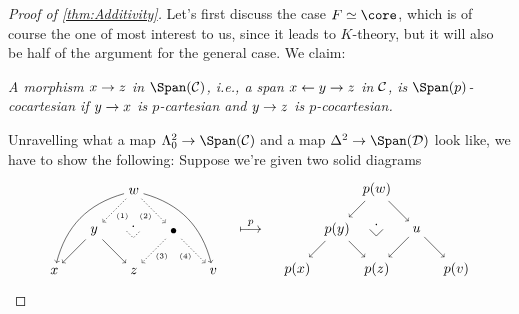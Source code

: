 \documentclass[a4paper, 10pt, oneside, DIV=9, chapterprefix=true, numbers=enddot,bibliography=totoc]{scrbook}
\begin{document}
\begin{proof}[Proof of \cref{thm:Additivity}]
	Let's first discuss the case $F\simeq \core$, which is of course the one of most interest to us, since it leads to $K$-theory, but it will also be half of the argument for the general case. We claim:
	\begin{alphanumerate}
		\item[\itememph{\boxtimes}]\itshape A morphism $x\morphism z$ in $\Span(\Cc)$, i.e., a span $x\lmorphism y\morphism z$ in $\mathcal{C}$, is $\Span(p)$-cocartesian if $y\morphism x$ is $p$-cartesian and $y\morphism z$ is $p$-cocartesian.
	\end{alphanumerate}
	Unravelling what a map $\Lambda_0^2\morphism \Span(\Cc)$ and a map $\Delta^2\morphism\Span(\Dd)$ look like, we have to show the following: Suppose we're given two solid diagrams
	\begin{equation*}
		\begin{tikzpicture}[x=1cm,y=1cm,line cap=round,baseline=(10.base)]
			\node (00) at (0,0) {$x$};
			\node (01) at (2,0) {$z$};
			\node (02) at (4,0) {$v$};
			\node (10) at (1,1) {$y$};
			\node (11) at (3,1) {$\bullet$};
			\node (20) at (2,2) {$w$};
			\draw[-to] (10) to (00);
			\draw[-to] (10) to (01);
			\draw[-to,dotted] (20) to node[pos=0.5,below right=-0.5ex] {$\scriptscriptstyle (1)$} (10);
			\draw[-to,dotted] (20) to node[pos=0.5,below left=-0.5ex] {$\scriptscriptstyle (2)$} (11);
			\draw[-to,dotted] (11) to node[pos=0.5,below right=-0.5ex] {$\scriptscriptstyle (3)$} (01);
			\draw[-to,dotted] (11) to node[pos=0.5,below left=-0.5ex] {$\scriptscriptstyle (4)$} (02);
			\node[dotted,rotate=-45] at (2,1) {$\scriptstyle\pullbacksign$};
			\draw[-to,bend right] (20) to (00);
			\draw[-to,bend left] (20) to (02);
		\end{tikzpicture}\quad\overset{p}{\longmapsto}\quad
		\begin{tikzpicture}[x=1cm,y=1cm,line cap=round,baseline=(10.base)]
			\node (00) at (0,0) {$p(x)$};
			\node (01) at (2,0) {$p(z)$};
			\node (02) at (4,0) {$p(v)$};
			\node (10) at (1,1) {$p(y)$};
			\node (11) at (3,1) {$u$};
			\node (20) at (2,2) {$p(w)$};
			\draw[-to] (10) to (00);
			\draw[-to] (10) to (01);
			\draw[-to] (20) to (10);
			\draw[-to] (20) to (11);
			\draw[-to] (11) to (01);
			\draw[-to] (11) to (02);
			\node[rotate=-45] at (2,1) {$\scriptstyle\pullbacksign$};
		\end{tikzpicture}
	\end{equation*}

\end{proof}
\end{document}
